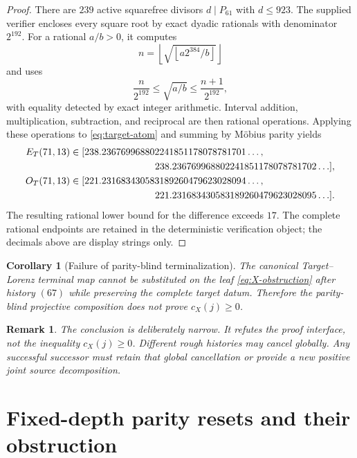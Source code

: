 \documentclass[11pt]{article}
\newtheorem{corollary}[theorem]{Corollary}
\newtheorem{remark}[theorem]{Remark}
\newcommand{\1}{\mathbf 1}
\begin{document}
\begin{proof}
There are $239$ active squarefree divisors $d\mid P_{61}$ with $d\le923$.
The supplied verifier encloses every square root by exact dyadic rationals with
denominator $2^{192}$.  For a rational $a/b>0$, it computes
\[
 n=\left\lfloor\sqrt{\left\lfloor a2^{384}/b\right\rfloor}\right\rfloor
\]
and uses
\[
 \frac{n}{2^{192}}
 \le \sqrt{a/b}
 \le \frac{n+1}{2^{192}},
\]
with equality detected by exact integer arithmetic.  Interval addition,
multiplication, subtraction, and reciprocal are then rational operations.
Applying these operations to \eqref{eq:target-atom} and summing by M\"obius
parity yields
\begin{align*}
E_T(71,13)&\in
[238.236769968802241851178078781701\ldots,\\
&\hspace{31mm}238.236769968802241851178078781702\ldots],\\
O_T(71,13)&\in
[221.231683430583189260479623028094\ldots,\\
&\hspace{31mm}221.231683430583189260479623028095\ldots].
\end{align*}
The resulting rational lower bound for the difference exceeds $17$.
The complete rational endpoints are retained in the deterministic verification
object; the decimals above are display strings only.
\end{proof}

\begin{corollary}[Failure of parity-blind terminalization]
The canonical Target--Lorenz terminal map cannot be substituted on the leaf
\eqref{eq:X-obstruction} after history $(67)$ while preserving the complete
target datum.  Therefore the parity-blind projective composition does not prove
$c_X(j)\ge0$.
\end{corollary}

\begin{remark}
The conclusion is deliberately narrow.  It refutes the proof interface, not the
inequality $c_X(j)\ge0$.  Different rough histories may cancel globally.  Any
successful successor must retain that global cancellation or provide a new
positive joint source decomposition.
\end{remark}

\section{Fixed-depth parity resets and their obstruction}
\end{document}
